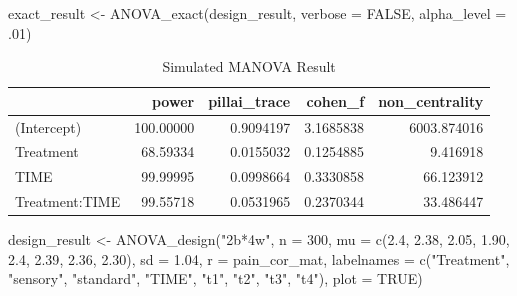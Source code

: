 \documentclass[
]{book}
\newenvironment{Shaded}{\begin{snugshade}}{\end{snugshade}}
\newcommand{\AttributeTok}[1]{\textcolor[rgb]{0.77,0.63,0.00}{#1}}
\newcommand{\ConstantTok}[1]{\textcolor[rgb]{0.00,0.00,0.00}{#1}}
\newcommand{\DecValTok}[1]{\textcolor[rgb]{0.00,0.00,0.81}{#1}}
\newcommand{\FloatTok}[1]{\textcolor[rgb]{0.00,0.00,0.81}{#1}}
\newcommand{\FunctionTok}[1]{\textcolor[rgb]{0.00,0.00,0.00}{#1}}
\newcommand{\NormalTok}[1]{#1}
\newcommand{\OtherTok}[1]{\textcolor[rgb]{0.56,0.35,0.01}{#1}}
\newcommand{\StringTok}[1]{\textcolor[rgb]{0.31,0.60,0.02}{#1}}
\begin{document}
\begin{Shaded}
\begin{Highlighting}[]
\NormalTok{exact\_result }\OtherTok{\textless{}{-}} \FunctionTok{ANOVA\_exact}\NormalTok{(design\_result, }\AttributeTok{verbose =} \ConstantTok{FALSE}\NormalTok{,}
                            \AttributeTok{alpha\_level =}\NormalTok{ .}\DecValTok{01}\NormalTok{)}
\end{Highlighting}
\end{Shaded}

\begin{table}[!h]

\caption{\label{tab:unnamed-chunk-167}Simulated MANOVA Result}
\centering
\begin{tabular}[t]{l|r|r|r|r}
\hline
  & power & pillai\_trace & cohen\_f & non\_centrality\\
\hline
(Intercept) & 100.00000 & 0.9094197 & 3.1685838 & 6003.874016\\
\hline
Treatment & 68.59334 & 0.0155032 & 0.1254885 & 9.416918\\
\hline
TIME & 99.99995 & 0.0998664 & 0.3330858 & 66.123912\\
\hline
Treatment:TIME & 99.55718 & 0.0531965 & 0.2370344 & 33.486447\\
\hline
\end{tabular}
\end{table}

\begin{Shaded}
\begin{Highlighting}[]
\NormalTok{design\_result }\OtherTok{\textless{}{-}} \FunctionTok{ANOVA\_design}\NormalTok{(}\StringTok{"2b*4w"}\NormalTok{,}
                              \AttributeTok{n =} \DecValTok{300}\NormalTok{,}
                              \AttributeTok{mu =} \FunctionTok{c}\NormalTok{(}\FloatTok{2.4}\NormalTok{, }\FloatTok{2.38}\NormalTok{, }\FloatTok{2.05}\NormalTok{, }\FloatTok{1.90}\NormalTok{,}
                                     \FloatTok{2.4}\NormalTok{, }\FloatTok{2.39}\NormalTok{, }\FloatTok{2.36}\NormalTok{, }\FloatTok{2.30}\NormalTok{),}
                              \AttributeTok{sd =} \FloatTok{1.04}\NormalTok{,}
                              \AttributeTok{r =}\NormalTok{ pain\_cor\_mat,}
                              \AttributeTok{labelnames =} \FunctionTok{c}\NormalTok{(}\StringTok{"Treatment"}\NormalTok{, }\StringTok{"sensory"}\NormalTok{, }\StringTok{"standard"}\NormalTok{,}
                                             \StringTok{"TIME"}\NormalTok{, }\StringTok{"t1"}\NormalTok{, }\StringTok{"t2"}\NormalTok{, }\StringTok{"t3"}\NormalTok{, }\StringTok{"t4"}\NormalTok{),}
                              \AttributeTok{plot =} \ConstantTok{TRUE}\NormalTok{)}
\end{Highlighting}
\end{Shaded}
\end{document}
